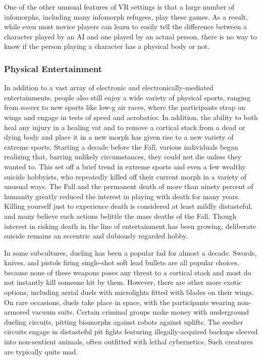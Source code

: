 One of the other unusual features of VR settings is 
that a large number of infomorphs, including many 
infomorph refugees, play these games. As a result, 
while even most novice players can learn to easily tell 
the difference between a character played by an AI 
and one played by an actual person, there is no way 
to know if the person playing a character has a physical
body or not.

\subsubsection{Physical Entertainment}

In addition to a vast array of electronic and 
electronically-mediated entertainments, people also 
still enjoy a wide variety of physical sports, ranging 
from soccer to new sports like low-g air races, where 
the participants strap on wings and engage in tests 
of speed and acrobatics. In addition, the ability to 
both heal any injury in a healing vat and to remove a 
cortical stack from a dead or dying body and place it 
in a new morph has given rise to a new variety of extreme
sports. Starting a decade before the Fall, various
individuals began realizing that, barring unlikely
circumstances, they could not die unless they wanted 
to. This set off a brief trend in extreme sports and 
even a few wealthy suicide hobbyists, who repeatedly 
killed off their current morph in a variety of unusual 
ways. The Fall and the permanent death of more 
than ninety percent of humanity greatly reduced the 
interest in playing with death for many years. Killing
yourself just to experience death is considered
at least mildly distasteful, and many believe such 
actions belittle the mass deaths of the Fall. Though 
interest in risking death in the line of entertainment 
has been growing, deliberate suicide remains an eccentric
and dubiously regarded hobby.

In some subcultures, dueling has been a popular fad 
for almost a decade. Swords, knives, and pistols firing 
single-shot soft lead bullets are all popular choices, 
because none of these weapons poses any threat to a 
cortical stack and most do not instantly kill someone 
hit by them. However, there are other more exotic 
options, including aerial duels with microlights fitted 
with blades on their wings. On rare occasions, duels 
take place in space, with the participants wearing 
non-armored vacuum suits. Certain criminal groups 
make money with underground dueling circuits, pitting
biomorphs against robots against uplifts. The
seedier circuits engage in distasteful pit fights featuring
illegally-acquired backups sleeved into non-sentient
animals, often outfitted with lethal cybernetics.
Such creatures are typically quite mad.


